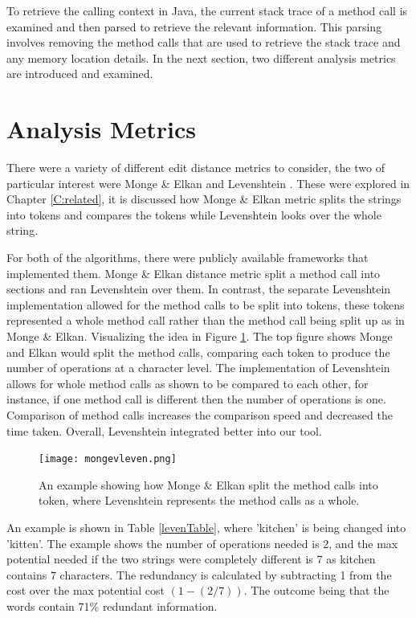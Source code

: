 To retrieve the calling context in Java, the current stack trace of a method call is examined and then parsed to retrieve the relevant information. This parsing involves removing the method calls that are used to retrieve the stack trace and any memory location details.  In the next section, two different analysis metrics are introduced and examined.

\section{Analysis Metrics}
\label{S:metrics}

There were a variety of different edit distance metrics to consider, the two of particular interest were Monge \& Elkan \cite{monge1997efficient} and Levenshtein \cite{levenshtein1966binary}. These were explored in Chapter \ref{C:related}, it is discussed how Monge \& Elkan metric splits the strings into tokens and compares the tokens while Levenshtein looks over the whole string. 

For both of the algorithms, there were publicly available frameworks that implemented them. Monge \& Elkan distance metric split a method call into sections and ran Levenshtein over them. In contrast, the separate Levenshtein implementation allowed for the method calls to be split into tokens, these tokens represented a whole method call rather than the method call being split up as in Monge \& Elkan. Visualizing the idea in Figure \ref{fig:mongevleven}. The top figure shows Monge and Elkan would split the method calls, comparing each token to produce the number of operations at a character level. The implementation of Levenshtein allows for whole method calls as shown to be compared to each other, for instance, if one method call is different then the number of operations is one. Comparison of method calls increases the comparison speed and decreased the time taken. Overall, Levenshtein integrated better into our tool.

\begin{figure}[h]
\begin{center}
\texttt{[image: mongevleven.png]}
\end{center}
\caption{An example showing how Monge \& Elkan split the method calls into token, where Levenshtein represents the method calls as a whole.}
\label{fig:mongevleven}
\end{figure}

An example is shown in Table \ref{levenTable}, where 'kitchen' is being changed into 'kitten'. The example shows the number of operations needed is 2, and the max potential needed if the two strings were completely different is 7 as kitchen contains 7 characters. The redundancy is calculated by subtracting 1 from the cost over the max potential cost $(1 - (2/7)) $. The outcome being that the words contain 71\% redundant information. 

